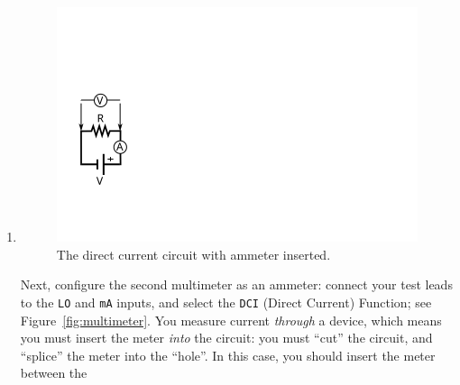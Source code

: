\documentclass[12pt]{article}
\begin{document}
\begin{enumerate}
\begin{figure}
    \caption{The simplest direct current circuit, with voltmeter installed.}
    \label{fig:simplest_with_voltmeter}
  \end{figure}
  We'll now get a feel for how the meter works.  First, connect the
  test leads to opposite ends of the resistor - that is,
  \textit{across}) the resistor
  (Figure~\ref{fig:simplest_with_voltmeter}).
  
  Now, raise the voltage on the power supply to something like
  \unit[10]{V}; If you have connected the circuit and meter correctly,
  the voltage displayed by the multimeter should roughly match that on
  the supply.  If not, you did something wrong and should ``debug''
  your connections to make sure they are correct.  What happens when
  you swap the leads connected to the resistor?  Why?

  Again, turn the voltage down to zero before proceeding; unless our
  instructions say otherwise, you should always do this before
  changing the configuration of a circuit.
\item 
  \begin{figure}
    \centering
    \includegraphics[width=\textwidth/5]{figures/simplest_with_ammeter}
    \caption{The direct current circuit with ammeter inserted.}
    \label{fig:simplest_with_ammeter}
  \end{figure}
  Next, configure the second multimeter as an ammeter: connect your
  test leads to the \texttt{LO} and \texttt{mA} inputs, and select the
  \texttt{DCI} (Direct Current) Function; see
  Figure~\ref{fig:multimeter}.  You measure current \textit{through} a
  device, which means you must insert the meter \textit{into} the
  circuit: you must ``cut'' the circuit, and ``splice'' the meter into
  the ``hole''.  In this case, you should insert the meter between the

\end{enumerate}
\end{document}
